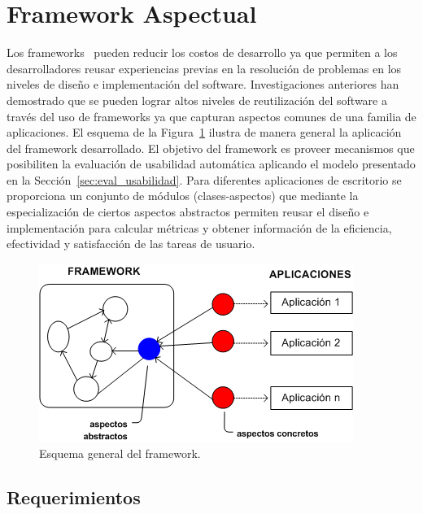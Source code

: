 \section{Framework Aspectual}
\label{sec:framework_aspectual}

Los frameworks~\cite{JOHNSON1997} pueden reducir los costos de desarrollo ya que permiten a los desarrolladores reusar experiencias previas en la resolución de problemas en los niveles de diseño e implementación del software. Investigaciones anteriores han demostrado que se pueden lograr altos niveles de reutilización del software a través del uso de frameworks ya que capturan aspectos comunes de una familia de aplicaciones. 
El esquema de la Figura~\ref{fig:fig2} ilustra de manera general la aplicación del framework desarrollado. El objetivo del framework es proveer mecanismos que posibiliten la evaluación de usabilidad automática aplicando el modelo presentado en la Sección~\ref{sec:eval_usabilidad}. Para diferentes aplicaciones de escritorio se proporciona un conjunto de módulos (clases-aspectos) que mediante la especialización de ciertos aspectos abstractos permiten reusar el diseño e implementación para calcular métricas y obtener información de la eficiencia, efectividad y satisfacción de las tareas de usuario.
\squeezeup
\begin{figure}[ht!]
	\centering
	\includegraphics[scale=0.50]{figs/fig2.png}
	\caption{\label{fig:fig2} Esquema general del framework.}
\end{figure}
\squeezeup

\subsection{Requerimientos}
\label{subsec:requerimientos}

